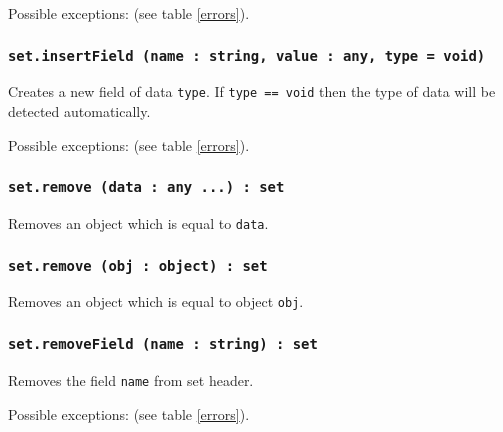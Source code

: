 Possible exceptions:  (see table \ref{errors}).

\subsubsection{\texttt{set.insertField (name : string, value : any, type = void)}}

Creates a new field of data \texttt{type}. If \texttt{type == void} then the type of data will be detected automatically.

Possible exceptions:  (see table \ref{errors}).

\subsubsection{\texttt{set.remove (data : any ...) : set}}

Removes an object which is equal to \texttt{data}.

\subsubsection{\texttt{set.remove (obj : object) : set}}

Removes an object which is equal to object \texttt{obj}.

\subsubsection{\texttt{set.removeField (name : string) : set}}

Removes the field \texttt{name} from set header.

Possible exceptions:  (see table \ref{errors}).
